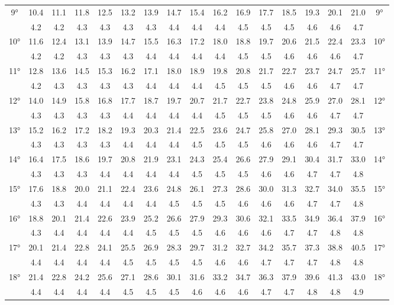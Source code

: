 \begin{footnotesize}
\begin{tabular}{c || c | c | c | c | c | c | c | c | c | c | c | c | c | c | c || c}
		\multirow{2}{*}{9°}&10.4&11.1&11.8&12.5&13.2&13.9&14.7&15.4&16.2&16.9&17.7&18.5&19.3&20.1&21.0&\multirow{2}{*}{9°}\\ \space&4.2&4.2&4.3&4.3&4.3&4.3&4.4&4.4&4.4&4.5&4.5&4.5&4.6&4.6&4.7&\space\\\hline
		\multirow{2}{*}{10°}&11.6&12.4&13.1&13.9&14.7&15.5&16.3&17.2&18.0&18.8&19.7&20.6&21.5&22.4&23.3&\multirow{2}{*}{10°}\\ \space&4.2&4.2&4.3&4.3&4.3&4.4&4.4&4.4&4.4&4.5&4.5&4.6&4.6&4.6&4.7&\space\\\hline
		\multirow{2}{*}{11°}&12.8&13.6&14.5&15.3&16.2&17.1&18.0&18.9&19.8&20.8&21.7&22.7&23.7&24.7&25.7&\multirow{2}{*}{11°}\\ \space&4.2&4.3&4.3&4.3&4.3&4.4&4.4&4.4&4.5&4.5&4.5&4.6&4.6&4.7&4.7&\space\\\hline
		\multirow{2}{*}{12°}&14.0&14.9&15.8&16.8&17.7&18.7&19.7&20.7&21.7&22.7&23.8&24.8&25.9&27.0&28.1&\multirow{2}{*}{12°}\\ \space&4.3&4.3&4.3&4.3&4.4&4.4&4.4&4.4&4.5&4.5&4.5&4.6&4.6&4.7&4.7&\space\\\hline
		\multirow{2}{*}{13°}&15.2&16.2&17.2&18.2&19.3&20.3&21.4&22.5&23.6&24.7&25.8&27.0&28.1&29.3&30.5&\multirow{2}{*}{13°}\\ \space&4.3&4.3&4.3&4.3&4.4&4.4&4.4&4.5&4.5&4.5&4.6&4.6&4.6&4.7&4.7&\space\\\hline
		\multirow{2}{*}{14°}&16.4&17.5&18.6&19.7&20.8&21.9&23.1&24.3&25.4&26.6&27.9&29.1&30.4&31.7&33.0&\multirow{2}{*}{14°}\\ \space&4.3&4.3&4.3&4.4&4.4&4.4&4.4&4.5&4.5&4.5&4.6&4.6&4.7&4.7&4.8&\space\\\hline
		\multirow{2}{*}{15°}&17.6&18.8&20.0&21.1&22.4&23.6&24.8&26.1&27.3&28.6&30.0&31.3&32.7&34.0&35.5&\multirow{2}{*}{15°}\\ \space&4.3&4.3&4.4&4.4&4.4&4.4&4.5&4.5&4.5&4.6&4.6&4.6&4.7&4.7&4.8&\space\\\hline
		\multirow{2}{*}{16°}&18.8&20.1&21.4&22.6&23.9&25.2&26.6&27.9&29.3&30.6&32.1&33.5&34.9&36.4&37.9&\multirow{2}{*}{16°}\\ \space&4.3&4.4&4.4&4.4&4.4&4.5&4.5&4.5&4.6&4.6&4.6&4.7&4.7&4.8&4.8&\space\\\hline
		\multirow{2}{*}{17°}&20.1&21.4&22.8&24.1&25.5&26.9&28.3&29.7&31.2&32.7&34.2&35.7&37.3&38.8&40.5&\multirow{2}{*}{17°}\\ \space&4.4&4.4&4.4&4.4&4.5&4.5&4.5&4.5&4.6&4.6&4.7&4.7&4.7&4.8&4.8&\space\\\hline
		\multirow{2}{*}{18°}&21.4&22.8&24.2&25.6&27.1&28.6&30.1&31.6&33.2&34.7&36.3&37.9&39.6&41.3&43.0&\multirow{2}{*}{18°}\\ \space&4.4&4.4&4.4&4.4&4.5&4.5&4.5&4.6&4.6&4.6&4.7&4.7&4.8&4.8&4.9&\space\\\hline

\end{tabular}
\end{footnotesize}
